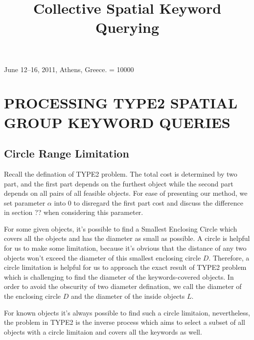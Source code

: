 \documentclass{sig-alternate}
\begin{document}
 {June 12--16, 2011, Athens, Greece.}
\widowpenalty = 10000
%

\title{Collective Spatial Keyword Querying}
%
%



\maketitle


\section{PROCESSING TYPE2 SPATIAL GROUP KEYWORD QUERIES} \label{sec:type2}
\subsection{Circle Range Limitation} \label{secsub:type2:limitation}
Recall the defination of \textsf{TYPE2} problem. The total cost is determined
by two part, and the first part depends on the furthest object while
the second part depends on all pairs of all feasible objects.
For ease of presenting our method, we set parameter $\alpha$ into 0
to disregard the first part cost and discuss the difference
in section ?? when considering this parameter.\par
%
For some given objects, it's possible to find a \textsf{Smallest Enclosing Circle}
which covers all the objects and has the diameter as small as possible. A circle is
helpful for us to make some limitation, because it's obvious that the distance of
any two objects won't exceed the diameter of this smallest enclosing circle $D$.
Therefore, a circle limitation is helpful for us to approach the exact result
of \textsf{TYPE2} problem which is challenging to find the diameter of the keywords-covered
objects. In order to avoid the obscurity of two diameter defination, we call the
diameter of the enclosing circle $D$ and the diameter of the inside objects $L$.\par
%
For known objects it's always possible to find such a circle limitaion,
nevertheless, the problem in \textsf{TYPE2} is the inverse process which aims to
select a subset of all objects with a circle limitaion and covers all the
keywords as well.
\end{document}
